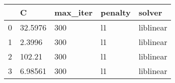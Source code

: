 \begin{tabular}{lllll}
\toprule
{} &        C & max\_iter & penalty &     solver \\
\midrule
0 &  32.5976 &      300 &      l1 &  liblinear \\
1 &   2.3996 &      300 &      l1 &  liblinear \\
2 &   102.21 &      300 &      l1 &  liblinear \\
3 &  6.98561 &      300 &      l1 &  liblinear \\
\bottomrule
\end{tabular}
